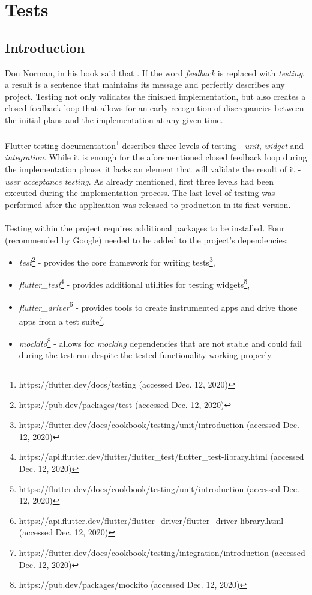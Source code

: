 \chapter{Tests}\label{ch:tests}
\section{Introduction}\label{sec:tests:introduction}
Don Norman, in his book  \cite{normanDesignEverydayThings2013} said that . If the word \textit{feedback} is replaced with \textit{testing}, a result is a sentence that maintains its message and perfectly describes any project. Testing not only validates the finished implementation, but also creates a closed feedback loop that allows for an early recognition of discrepancies between the initial plans and the implementation at any given time.
\\\\
Flutter testing documentation\footnote{https://flutter.dev/docs/testing (accessed Dec. 12, 2020)} describes three levels of testing - \textit{unit}, \textit{widget} and \textit{integration}. While it is enough for the aforementioned closed feedback loop during the implementation phase, it lacks an element that will validate the result of it - \textit{user acceptance testing}. As already mentioned, first three levels had been executed during the implementation process. The last level of testing was performed after the application was released to production in its first version.
\\\\
Testing within the project requires additional packages to be installed. Four (recommended by Google) needed to be added to the project's dependencies:
\begin{itemize}
\item \textit{test}\footnote{https://pub.dev/packages/test (accessed Dec. 12, 2020)} - provides the core framework for writing tests\footnote{https://flutter.dev/docs/cookbook/testing/unit/introduction (accessed Dec. 12, 2020)},
\item \textit{flutter\_test}\footnote{https://api.flutter.dev/flutter/flutter\_test/flutter\_test-library.html (accessed Dec. 12, 2020)} - provides additional utilities for testing widgets\footnote{https://flutter.dev/docs/cookbook/testing/unit/introduction (accessed Dec. 12, 2020)},
\item \textit{flutter\_driver}\footnote{https://api.flutter.dev/flutter/flutter\_driver/flutter\_driver-library.html (accessed Dec. 12, 2020)} - provides tools to create instrumented apps and drive those apps from a test suite\footnote{https://flutter.dev/docs/cookbook/testing/integration/introduction (accessed Dec. 12, 2020)}.
\item \textit{mockito}\footnote{https://pub.dev/packages/mockito (accessed Dec. 12, 2020)} - allows for \textit{mocking} dependencies that are not stable and could fail during the test run despite the tested functionality working properly.
\end{itemize}


